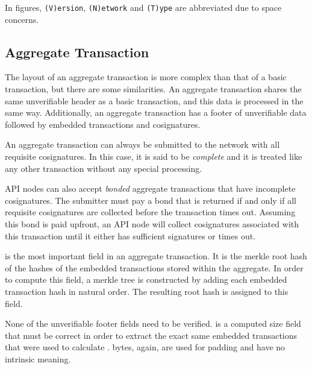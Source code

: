 In figures, \texttt{(V)ersion}, \texttt{(N)etwork} and \texttt{(T)ype} are abbreviated due to space concerns.

\subsection{Aggregate Transaction}
\label{sec:transactions:aggregate}

The layout of an aggregate transaction is more complex than that of a basic transaction, but there are some similarities.
An aggregate transaction shares the same unverifiable header as a basic transaction, and this data is processed in the same way.
Additionally, an aggregate transaction has a footer of unverifiable data followed by embedded transactions and cosignatures.

An aggregate transaction can always be submitted to the network with all requisite cosignatures.
In this case, it is said to be \emph{complete} and it is treated like any other transaction without any special processing.

API nodes can also accept \emph{bonded} aggregate transactions that have incomplete cosignatures.
The submitter must pay a bond that is returned if and only if all requisite cosignatures are collected before the transaction times out.
Assuming this bond is paid upfront, an API node will collect cosignatures associated with this transaction until it either has sufficient signatures or times out.

 is the most important field in an aggregate transaction.
It is the merkle root hash of the hashes of the embedded transactions stored within the aggregate.
In order to compute this field, a merkle tree is constructed by adding each embedded transaction hash in natural order.
The resulting root hash is assigned to this field.

None of the unverifiable footer fields need to be verified.
 is a computed size field that must be correct in order to extract the exact same embedded transactions that were used to calculate .
 bytes, again, are used for padding and have no intrinsic meaning.

